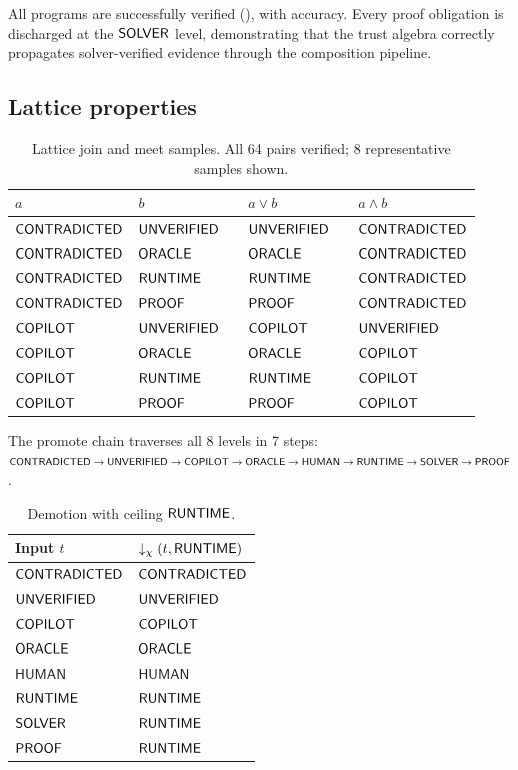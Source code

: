 \documentclass[11pt]{article}
\begin{document}
All \compTotalPrograms{} programs are successfully verified
(), with \compOverallAccuracy{} accuracy.
Every proof obligation is discharged at the $\mathsf{SOLVER}$ level,
demonstrating that the trust algebra correctly propagates
solver-verified evidence through the composition pipeline.

\subsection{Lattice properties}\label{sec:eval-lattice}

\begin{table}[t]
\centering
\caption{Lattice join and meet samples.
All 64 pairs verified; 8 representative samples shown.}
\label{tab:lattice-join-meet}
\small
\begin{tabular}{@{}llclll@{}}
\toprule
$a$ & $b$ & & $a \vee b$ & & $a \wedge b$ \\
\midrule
$\mathsf{CONTRADICTED}$ & $\mathsf{UNVERIFIED}$ && $\mathsf{UNVERIFIED}$ && $\mathsf{CONTRADICTED}$ \\
$\mathsf{CONTRADICTED}$ & $\mathsf{ORACLE}$ && $\mathsf{ORACLE}$ && $\mathsf{CONTRADICTED}$ \\
$\mathsf{CONTRADICTED}$ & $\mathsf{RUNTIME}$ && $\mathsf{RUNTIME}$ && $\mathsf{CONTRADICTED}$ \\
$\mathsf{CONTRADICTED}$ & $\mathsf{PROOF}$ && $\mathsf{PROOF}$ && $\mathsf{CONTRADICTED}$ \\
$\mathsf{COPILOT}$ & $\mathsf{UNVERIFIED}$ && $\mathsf{COPILOT}$ && $\mathsf{UNVERIFIED}$ \\
$\mathsf{COPILOT}$ & $\mathsf{ORACLE}$ && $\mathsf{ORACLE}$ && $\mathsf{COPILOT}$ \\
$\mathsf{COPILOT}$ & $\mathsf{RUNTIME}$ && $\mathsf{RUNTIME}$ && $\mathsf{COPILOT}$ \\
$\mathsf{COPILOT}$ & $\mathsf{PROOF}$ && $\mathsf{PROOF}$ && $\mathsf{COPILOT}$ \\
\bottomrule
\end{tabular}
\end{table}

\noindent
The promote chain traverses all 8 levels in 7 steps:
$\mathsf{CONTRADICTED} \to \mathsf{UNVERIFIED} \to \mathsf{COPILOT} \to \mathsf{ORACLE}
\to \mathsf{HUMAN} \to \mathsf{RUNTIME} \to \mathsf{SOLVER} \to \mathsf{PROOF}$.

\begin{table}[t]
\centering
\caption{Demotion with ceiling $\mathsf{RUNTIME}$.}
\label{tab:demote-ceiling}
\begin{tabular}{@{}ll@{}}
\toprule
\textbf{Input} $t$ & $\downarrow_\chi(t, \mathsf{RUNTIME})$ \\
\midrule
$\mathsf{CONTRADICTED}$ & $\mathsf{CONTRADICTED}$ \\
$\mathsf{UNVERIFIED}$ & $\mathsf{UNVERIFIED}$ \\
$\mathsf{COPILOT}$ & $\mathsf{COPILOT}$ \\
$\mathsf{ORACLE}$ & $\mathsf{ORACLE}$ \\
$\mathsf{HUMAN}$ & $\mathsf{HUMAN}$ \\
$\mathsf{RUNTIME}$ & $\mathsf{RUNTIME}$ \\
$\mathsf{SOLVER}$ & $\mathsf{RUNTIME}$ \\
$\mathsf{PROOF}$ & $\mathsf{RUNTIME}$ \\
\bottomrule
\end{tabular}
\end{table}
\end{document}
